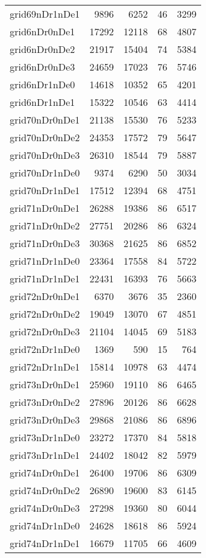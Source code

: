 \begin{tabular}{lrrrr}
grid69nDr1nDe1 & 9896 & 6252 & 46 & 3299 \\
grid6nDr0nDe1 & 17292 & 12118 & 68 & 4807 \\
grid6nDr0nDe2 & 21917 & 15404 & 74 & 5384 \\
grid6nDr0nDe3 & 24659 & 17023 & 76 & 5746 \\
grid6nDr1nDe0 & 14618 & 10352 & 65 & 4201 \\
grid6nDr1nDe1 & 15322 & 10546 & 63 & 4414 \\
grid70nDr0nDe1 & 21138 & 15530 & 76 & 5233 \\
grid70nDr0nDe2 & 24353 & 17572 & 79 & 5647 \\
grid70nDr0nDe3 & 26310 & 18544 & 79 & 5887 \\
grid70nDr1nDe0 & 9374 & 6290 & 50 & 3034 \\
grid70nDr1nDe1 & 17512 & 12394 & 68 & 4751 \\
grid71nDr0nDe1 & 26288 & 19386 & 86 & 6517 \\
grid71nDr0nDe2 & 27751 & 20286 & 86 & 6324 \\
grid71nDr0nDe3 & 30368 & 21625 & 86 & 6852 \\
grid71nDr1nDe0 & 23364 & 17558 & 84 & 5722 \\
grid71nDr1nDe1 & 22431 & 16393 & 76 & 5663 \\
grid72nDr0nDe1 & 6370 & 3676 & 35 & 2360 \\
grid72nDr0nDe2 & 19049 & 13070 & 67 & 4851 \\
grid72nDr0nDe3 & 21104 & 14045 & 69 & 5183 \\
grid72nDr1nDe0 & 1369 & 590 & 15 & 764 \\
grid72nDr1nDe1 & 15814 & 10978 & 63 & 4474 \\
grid73nDr0nDe1 & 25960 & 19110 & 86 & 6465 \\
grid73nDr0nDe2 & 27896 & 20126 & 86 & 6628 \\
grid73nDr0nDe3 & 29868 & 21086 & 86 & 6896 \\
grid73nDr1nDe0 & 23272 & 17370 & 84 & 5818 \\
grid73nDr1nDe1 & 24402 & 18042 & 82 & 5979 \\
grid74nDr0nDe1 & 26400 & 19706 & 86 & 6309 \\
grid74nDr0nDe2 & 26890 & 19600 & 83 & 6145 \\
grid74nDr0nDe3 & 27298 & 19360 & 80 & 6044 \\
grid74nDr1nDe0 & 24628 & 18618 & 86 & 5924 \\
grid74nDr1nDe1 & 16679 & 11705 & 66 & 4609 \\

\end{tabular}
